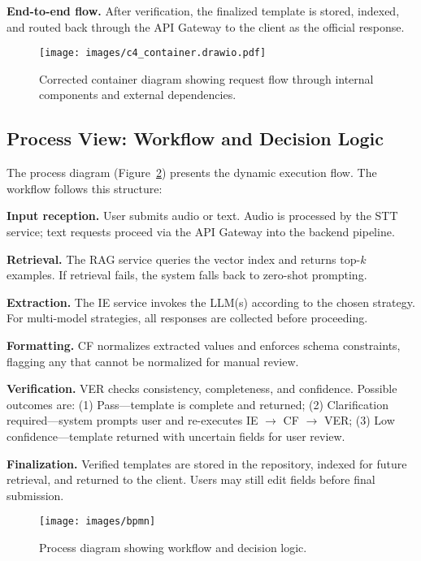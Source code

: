 \textbf{End-to-end flow.} After verification, the finalized template is stored, indexed, and routed back through the API Gateway to the client as the official response.

\begin{figure}[H]
  \centering
  \texttt{[image: images/c4\_container.drawio.pdf]}
  \caption{Corrected container diagram showing request flow through internal components and external dependencies.}
  \label{fig:c4-container}
\end{figure}

\subsection{Process View: Workflow and Decision Logic}
\label{subsec:process-view}

The process diagram (Figure~\ref{fig:bpmn}) presents the dynamic execution flow. The workflow follows this structure:

\textbf{Input reception.} User submits audio or text. Audio is processed by the STT service; text requests proceed via the API Gateway into the backend pipeline.

\textbf{Retrieval.} The RAG service queries the vector index and returns top-$k$ examples. If retrieval fails, the system falls back to zero-shot prompting.

\textbf{Extraction.} The IE service invokes the LLM(s) according to the chosen strategy. For multi-model strategies, all responses are collected before proceeding.

\textbf{Formatting.} CF normalizes extracted values and enforces schema constraints, flagging any that cannot be normalized for manual review.

\textbf{Verification.} VER checks consistency, completeness, and confidence. Possible outcomes are: (1) Pass—template is complete and returned; (2) Clarification required—system prompts user and re-executes IE $\rightarrow$ CF $\rightarrow$ VER; (3) Low confidence—template returned with uncertain fields for user review.

\textbf{Finalization.} Verified templates are stored in the repository, indexed for future retrieval, and returned to the client. Users may still edit fields before final submission.

\begin{figure}[H]
  \centering
  \texttt{[image: images/bpmn]}
  \caption{Process diagram showing workflow and decision logic.}
  \label{fig:bpmn}
\end{figure}

